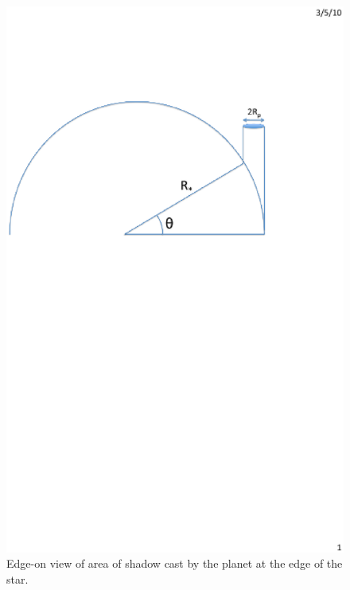 \documentclass[manuscript]{aastex}
\begin{document}
\begin{figure}
\includegraphics[width=\textwidth]{Chromospheric_shadow.eps}
\caption{Edge-on view of area of shadow cast by the planet
at the edge of the star.}
\label{fig01}
\end{figure}
\end{document}
